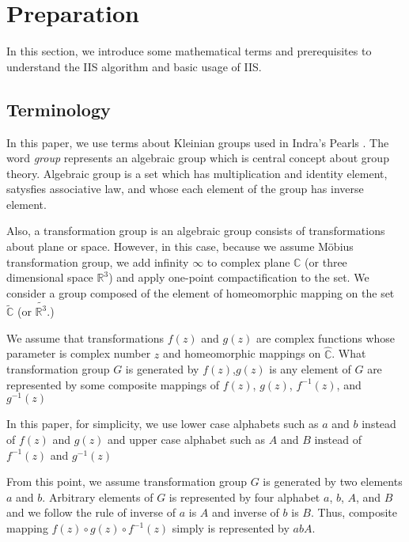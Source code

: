 
\section{Preparation}

In this section, we introduce some mathematical terms and prerequisites
to understand the IIS algorithm and basic usage of IIS.

\subsection{Terminology}

In this paper, we use terms about Kleinian groups used in Indra's
Pearls \cite{MumfordSeriesWright200204}.
The word \textit{group} represents an algebraic group which is
central concept about group theory.
Algebraic group is a set which has
multiplication and identity element, satysfies associative law, and
whose each element of the group has inverse element.

Also, a transformation group is an algebraic group consists of
transformations about plane or space.
However, in this case, because we assume M\"obius transformation
group, we add infinity $\infty$ to complex plane $\mathbb{C}$ (or three
dimensional space $\mathbb{R}^3$) and apply one-point compactification
to the set.
We consider a group composed of the element of homeomorphic mapping on
the set $\tilde{ \mathbb{C}}$ (or $\tilde{ \mathbb{R}^3 }$.)

We assume that transformations $f(z)$ and $g(z)$ are complex functions
whose parameter is complex number $z$
and homeomorphic mappings on $\hat{\mathbb{C}}$.
What transformation group $G$ is generated by $f(z)$,$g(z)$
is any element of $G$ are represented by some composite mappings of $f(z)$,
$g(z)$, $f^{-1}(z)$, and $g^{-1}(z)$

In this paper, for simplicity, we use
lower case alphabets such as $a$ and $b$ instead of $f(z)$ and $g(z)$ and
upper case alphabet such as $A$ and $B$ instead of $f^{-1}(z)$ and $g^{-1}(z)$

From this point, we assume transformation group $G$ is generated by two
elements $a$ and $b$. Arbitrary elements of $G$ is represented by
four alphabet $a$, $b$, $A$, and $B$ and we follow the rule of inverse
 of $a$ is $A$ and inverse of $b$ is $B$.
Thus, composite mapping $f(z)\circ g(z) \circ f^{-1}(z)$ simply
is represented by $abA$.

